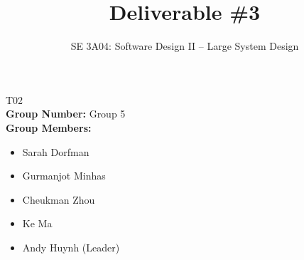 \documentclass[]{article}
\title{Deliverable \#3}
\author{SE 3A04: Software Design II -- Large System Design}
\date{}
\numberwithin{figure}{section} %
\begin{document}
\maketitle	
{} T02\\
{\bf Group Number:} Group 5 \\
{\bf Group Members:} 
\begin{itemize}
	\item Sarah Dorfman
	\item Gurmanjot Minhas
	\item Cheukman Zhou
	\item Ke Ma
	\item Andy Huynh (Leader)
\end{itemize}

















\end{document}
